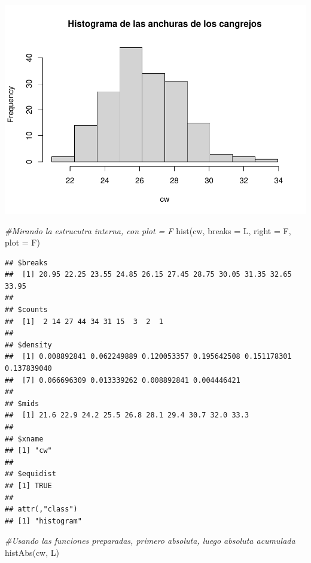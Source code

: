 \documentclass[
]{article}
\newenvironment{Shaded}{\begin{snugshade}}{\end{snugshade}}
\newcommand{\AttributeTok}[1]{\textcolor[rgb]{0.77,0.63,0.00}{#1}}
\newcommand{\CommentTok}[1]{\textcolor[rgb]{0.56,0.35,0.01}{\textit{#1}}}
\newcommand{\FunctionTok}[1]{\textcolor[rgb]{0.00,0.00,0.00}{#1}}
\newcommand{\NormalTok}[1]{#1}
\begin{document}
\includegraphics{EstadisticosAgrupados_files/figure-latex/unnamed-chunk-7-1.pdf}

\begin{Shaded}
\begin{Highlighting}[]
\CommentTok{\#Mirando la estrucutra interna, con plot = F}
\FunctionTok{hist}\NormalTok{(cw, }\AttributeTok{breaks =}\NormalTok{ L, }\AttributeTok{right =}\NormalTok{ F, }\AttributeTok{plot =}\NormalTok{ F)}
\end{Highlighting}
\end{Shaded}

\begin{verbatim}
## $breaks
##  [1] 20.95 22.25 23.55 24.85 26.15 27.45 28.75 30.05 31.35 32.65 33.95
## 
## $counts
##  [1]  2 14 27 44 34 31 15  3  2  1
## 
## $density
##  [1] 0.008892841 0.062249889 0.120053357 0.195642508 0.151178301 0.137839040
##  [7] 0.066696309 0.013339262 0.008892841 0.004446421
## 
## $mids
##  [1] 21.6 22.9 24.2 25.5 26.8 28.1 29.4 30.7 32.0 33.3
## 
## $xname
## [1] "cw"
## 
## $equidist
## [1] TRUE
## 
## attr(,"class")
## [1] "histogram"
\end{verbatim}

\begin{Shaded}
\begin{Highlighting}[]
\CommentTok{\#Usando las funciones preparadas, primero absoluta, luego absoluta acumulada}
\FunctionTok{histAbs}\NormalTok{(cw, L)}
\end{Highlighting}
\end{Shaded}
\end{document}
